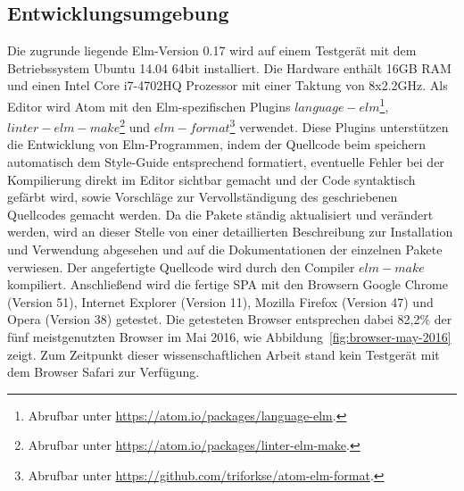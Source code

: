 \subsection{Entwicklungsumgebung}
\label{sec:Entwicklungsumgebung}
Die zugrunde liegende Elm-Version 0.17 wird auf einem Testgerät mit dem Betriebssystem Ubuntu 14.04 64bit installiert. Die Hardware enthält 16GB RAM und einen Intel Core i7-4702HQ Prozessor mit einer Taktung von 8x2.2GHz. Als Editor wird Atom mit den Elm-spezifischen Plugins $language-elm$\footnote{Abrufbar unter \url{https://atom.io/packages/language-elm}.}, $linter-elm-make$\footnote{Abrufbar unter \url{https://atom.io/packages/linter-elm-make}.} und $elm-format$\footnote{Abrufbar unter \url{https://github.com/triforkse/atom-elm-format}.} verwendet. Diese Plugins unterstützen die Entwicklung von Elm-Programmen, indem der Quellcode beim speichern automatisch dem Style-Guide entsprechend formatiert, eventuelle Fehler bei der Kompilierung direkt im Editor sichtbar gemacht und der Code syntaktisch gefärbt wird, sowie Vorschläge zur Vervollständigung des geschriebenen Quellcodes gemacht werden. Da die Pakete ständig aktualisiert und verändert werden, wird an dieser Stelle von einer detaillierten Beschreibung zur Installation und Verwendung abgesehen und auf die Dokumentationen der einzelnen Pakete verwiesen.
Der angefertigte Quellcode wird durch den Compiler $elm-make$ kompiliert.
Anschließend wird die fertige \ac{SPA} mit den Browsern Google Chrome (Version 51), Internet Explorer (Version 11), Mozilla Firefox (Version 47) und Opera (Version 38) getestet. Die getesteten Browser entsprechen dabei 82,2\% der fünf meistgenutzten Browser im Mai 2016, wie Abbildung~\ref{fig:browser-may-2016} zeigt. Zum Zeitpunkt dieser wissenschaftlichen Arbeit stand kein Testgerät mit dem Browser Safari zur Verfügung.

